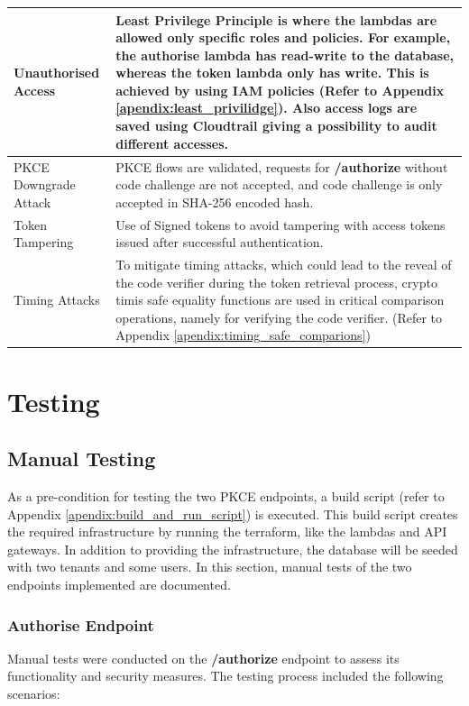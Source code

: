 \begin{longtable}{|p{5cm}|p{10cm}|}
\begin{itemize}
\end{itemize}
\hline
 Unauthorised Access & Least Privilege Principle is where the lambdas are allowed only specific roles and policies. For example, the authorise lambda has read-write to the database, whereas the token lambda only has write. This is achieved by using IAM policies (Refer to Appendix \ref{apendix:least_privilidge}). Also access logs are saved using Cloudtrail giving a possibility to audit different accesses.\\
\hline
PKCE Downgrade Attack & PKCE flows are validated, requests for \textbf{/authorize} without code challenge are not accepted, and code challenge is only accepted in SHA-256 encoded hash. \\
\hline
Token Tampering & Use of Signed tokens to avoid tampering with access tokens issued after successful authentication.  \\
\hline
Timing Attacks & To mitigate timing attacks, which could lead to the reveal of the code verifier during the token retrieval process, crypto timis safe equality functions are used in critical comparison operations, namely for verifying the code verifier. (Refer to Appendix \ref{apendix:timing_safe_comparions})  \\
\hline
\end{longtable}

\section{Testing}

\subsection{Manual Testing}
As a pre-condition for testing the two PKCE endpoints, a build script (refer to Appendix \ref{apendix:build_and_run_script}) is executed. This build script creates the required infrastructure by running the terraform, like the lambdas and API gateways. In addition to providing the infrastructure, the database will be seeded with two tenants and some users. In this section, manual tests of the two endpoints implemented are documented.


\subsubsection{Authorise Endpoint}
Manual tests were conducted on the \textbf{/authorize} endpoint to assess its functionality and security measures. The testing process included the following scenarios:

